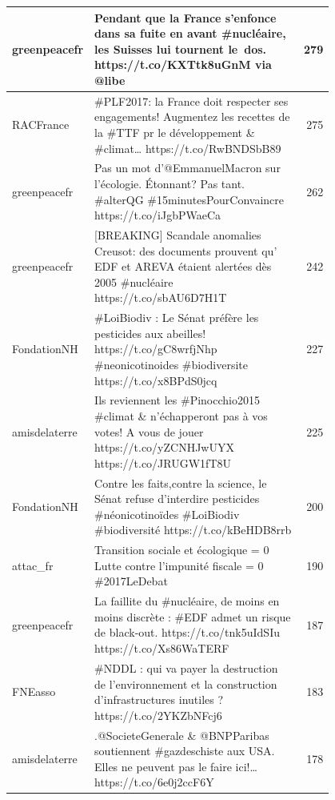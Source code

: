 \begin{landscape}
\begin{table}
\begin{tabularx}{\linewidth}{|L|K{0.8\linewidth}|R|}
                        greenpeacefr	&	Pendant que la France s'enfonce dans sa fuite en avant \#nucléaire, les Suisses lui tournent le dos. https://t.co/KXTtk8uGnM via @libe	&	279	\\ \hline
                        RACFrance	&	\#PLF2017: la France doit respecter ses engagements! Augmentez les recettes de la \#TTF pr le développement \& \#climat… https://t.co/RwBNDSbB89	&	275	\\ \hline
                        greenpeacefr	&	Pas un mot d'@EmmanuelMacron sur l'écologie. Étonnant? Pas tant. \#alterQG \#15minutesPourConvaincre https://t.co/iJgbPWaeCa	&	262	\\ \hline
                        greenpeacefr	&	[BREAKING] Scandale anomalies Creusot: des documents prouvent qu' EDF et AREVA étaient alertées dès 2005 \#nucléaire https://t.co/sbAU6D7H1T	&	242	\\ \hline
                        FondationNH	&	\#LoiBiodiv : Le Sénat préfère les pesticides aux abeilles! https://t.co/gC8wrfjNhp  \#neonicotinoides \#biodiversite https://t.co/x8BPdS0jcq	&	227	\\ \hline
                        amisdelaterre	&	Ils reviennent les \#Pinocchio2015 \#climat \& n'échapperont pas à vos votes! A vous de jouer https://t.co/yZCNHJwUYX \newline https://t.co/JRUGW1fT8U	&	225	\\ \hline
                        FondationNH	&	Contre les faits,contre la science, le Sénat refuse d'interdire pesticides \#néonicotinoïdes \#LoiBiodiv \#biodiversité https://t.co/kBeHDB8rrb	&	200	\\ \hline
                        attac\_fr &	Transition sociale et écologique = 0 \newline Lutte contre l'impunité fiscale = 0 \newline \#2017LeDebat	&	190	\\ \hline
                        greenpeacefr	&	La faillite du \#nucléaire, de moins en moins discrète : \#EDF admet un risque de black-out. https://t.co/tnk5uIdSIu https://t.co/Xs86WaTERF	&	187	\\ \hline
                        FNEasso	&	\#NDDL : qui va payer la destruction de l'environnement et la construction d'infrastructures inutiles ? https://t.co/2YKZbNFcj6	&	183	\\ \hline
                        amisdelaterre	&	.@SocieteGenerale \& @BNPParibas soutiennent \#gazdeschiste aux USA. Elles ne peuvent pas le faire ici!… https://t.co/6e0j2ccF6Y	&	178	\\ \hline
                    \end{tabularx}

                \end{table}
            \end{landscape}



